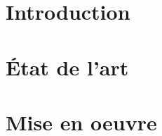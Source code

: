 \documentclass[
    iict, %
    iscl, %
]{heig-tb}
\begin{document}
\maketitle
\frontmatter
\clearemptydoublepage

\preamble
\authentification

\begin{abstract}
  
\end{abstract}

\begin{requirements}
  
\end{requirements}

\clearemptydoublepage
{
  \tableofcontents
}

\printnomenclature
\clearemptydoublepage
{}

\mainmatter
\chapter{Introduction}



\chapter{État de l'art}


\chapter{Mise en oeuvre}


%

\clearpage
\printbibliography

\appendix
\appendixpage
\addappheadtotoc



\let\cleardoublepage\clearpage
\backmatter

\label{glossaire}
\printnoidxglossary
\label{index}
\printindex

%
\end{document}
